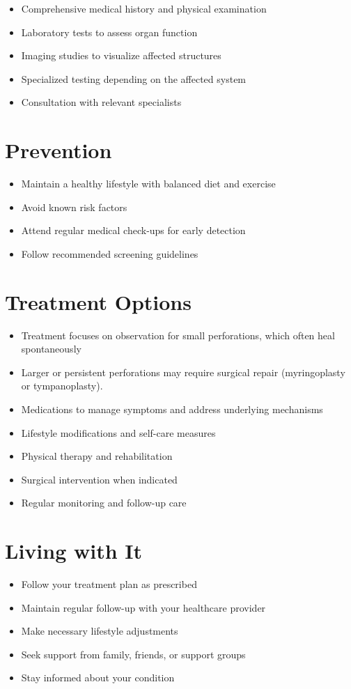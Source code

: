 \begin{itemize}[noitemsep]
  \item Comprehensive medical history and physical examination
  \item Laboratory tests to assess organ function
  \item Imaging studies to visualize affected structures
  \item Specialized testing depending on the affected system
  \item Consultation with relevant specialists
\end{itemize}
\section{Prevention}
\begin{itemize}[noitemsep]
  \item Maintain a healthy lifestyle with balanced diet and exercise
  \item Avoid known risk factors
  \item Attend regular medical check-ups for early detection
  \item Follow recommended screening guidelines
\end{itemize}
\section{Treatment Options}
\begin{itemize}[noitemsep]
  \item Treatment focuses on observation for small perforations, which often heal spontaneously
  \item Larger or persistent perforations may require surgical repair (myringoplasty or tympanoplasty).
  \item Medications to manage symptoms and address underlying mechanisms
  \item Lifestyle modifications and self-care measures
  \item Physical therapy and rehabilitation
  \item Surgical intervention when indicated
  \item Regular monitoring and follow-up care
\end{itemize}
\section{Living with It}
\begin{itemize}[noitemsep]
  \item Follow your treatment plan as prescribed
  \item Maintain regular follow-up with your healthcare provider
  \item Make necessary lifestyle adjustments
  \item Seek support from family, friends, or support groups
  \item Stay informed about your condition
\end{itemize}
